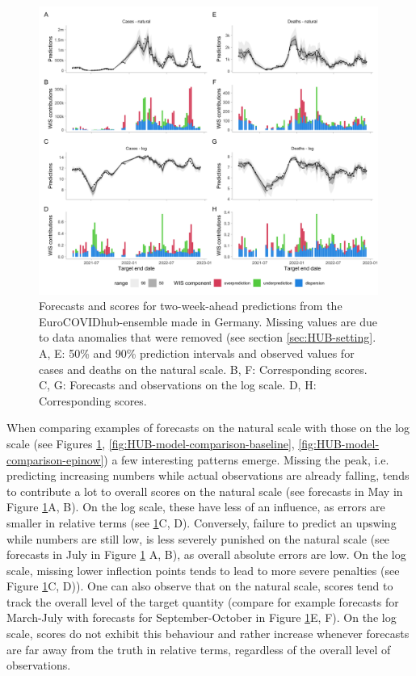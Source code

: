 \documentclass{article}
\begin{document}
\begin{figure}[h!]
    \centering
    \includegraphics[width=0.99\textwidth]{output/figures/HUB-model-comparison-ensemble.png}
    \caption{
    Forecasts and scores for two-week-ahead predictions from the EuroCOVIDhub-ensemble made in Germany. Missing values are due to data anomalies that were removed (see section \ref{sec:HUB-setting}. 
    A, E: 50\% and 90\% prediction intervals and observed values for cases and deaths on the natural scale. B, F: Corresponding scores. C, G: Forecasts and observations on the log scale. D, H: Corresponding scores. 
    }
    \label{fig:HUB-model-comparison-ensemble}
\end{figure}

When comparing examples of forecasts on the natural scale with those on the log scale (see Figures \ref{fig:HUB-model-comparison-ensemble}, \ref{fig:HUB-model-comparison-baseline}, \ref{fig:HUB-model-comparison-epinow}) a few interesting patterns emerge. Missing the peak, i.e. predicting increasing numbers while actual observations are already falling, tends to contribute a lot to overall scores on the natural scale (see forecasts in May in Figure \ref{fig:HUB-model-comparison-ensemble}A, B). On the log scale, these have less of an influence, as errors are smaller in relative terms (see \ref{fig:HUB-model-comparison-ensemble}C, D). Conversely, failure to predict an upswing while numbers are still low, is less severely punished on the natural scale (see forecasts in July in Figure \ref{fig:HUB-model-comparison-ensemble} A, B), as overall absolute errors are low. On the log scale, missing lower inflection points tends to lead to more severe penalties (see Figure \ref{fig:HUB-model-comparison-ensemble}C, D)). One can also observe that on the natural scale, scores tend to track the overall level of the target quantity (compare for example forecasts for March-July with forecasts for September-October in Figure \ref{fig:HUB-model-comparison-ensemble}E, F). On the log scale, scores do not exhibit this behaviour and rather increase whenever forecasts are far away from the truth in relative terms, regardless of the overall level of observations. 
\end{document}
